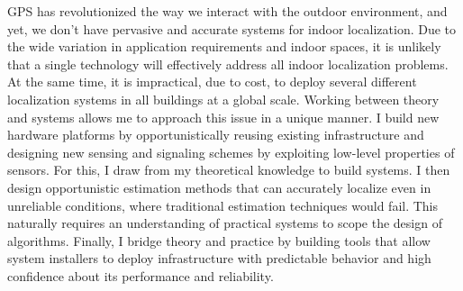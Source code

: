 \documentclass[10pt]{article}
\begin{document}
GPS has revolutionized the way we interact with the outdoor environment,  %
and yet, we don't have pervasive and accurate systems for indoor localization.  
Due to the wide variation in application requirements and indoor spaces, it is unlikely that a single technology will effectively address all indoor localization problems.  At the same time, it is impractical, due to cost, to deploy several different localization systems in all buildings at a global scale. %
Working between theory and systems allows me to approach this issue in a unique manner. I build new hardware platforms by opportunistically reusing existing infrastructure and designing new sensing and signaling schemes by exploiting low-level properties of sensors. For this, I draw from my theoretical knowledge to build systems. I then design opportunistic estimation methods that can accurately localize even in unreliable conditions, where traditional estimation techniques would fail. This naturally requires an understanding of practical systems to scope the design of algorithms. Finally, I bridge theory and practice by building tools that allow system installers to deploy infrastructure with predictable behavior and high confidence about its performance and reliability.  

\end{document}
